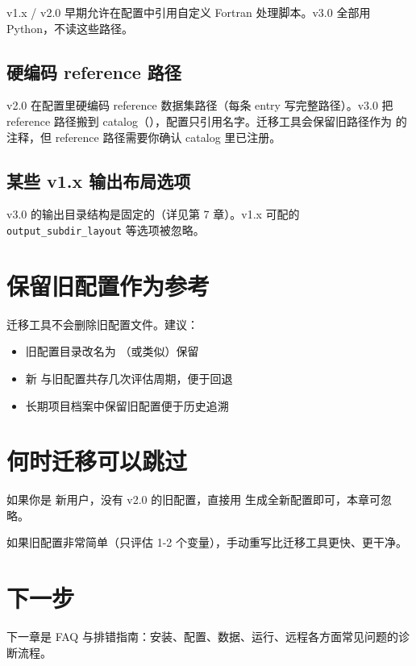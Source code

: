 v1.x / v2.0 早期允许在配置中引用自定义 Fortran 处理脚本。v3.0 全部用 Python，不读这些路径。

\subsection{硬编码 reference 路径}

v2.0 在配置里硬编码 reference 数据集路径（每条 entry 写完整路径）。v3.0 把 reference 路径搬到 catalog（），配置只引用名字。迁移工具会保留旧路径作为  的注释，但 reference 路径需要你确认 catalog 里已注册。

\subsection{某些 v1.x 输出布局选项}

v3.0 的输出目录结构是固定的（详见第 7 章）。v1.x 可配的 \texttt{output\_subdir\_layout} 等选项被忽略。

\section{保留旧配置作为参考}

迁移工具不会删除旧配置文件。建议：

\begin{itemize}
  \item 旧配置目录改名为 （或类似）保留
  \item 新  与旧配置共存几次评估周期，便于回退
  \item 长期项目档案中保留旧配置便于历史追溯
\end{itemize}

\section{何时迁移可以跳过}

如果你是 \openbench{} 新用户，没有 v2.0 的旧配置，直接用  生成全新配置即可，本章可忽略。

如果旧配置非常简单（只评估 1-2 个变量），手动重写比迁移工具更快、更干净。

\section{下一步}

下一章是 FAQ 与排错指南：安装、配置、数据、运行、远程各方面常见问题的诊断流程。
